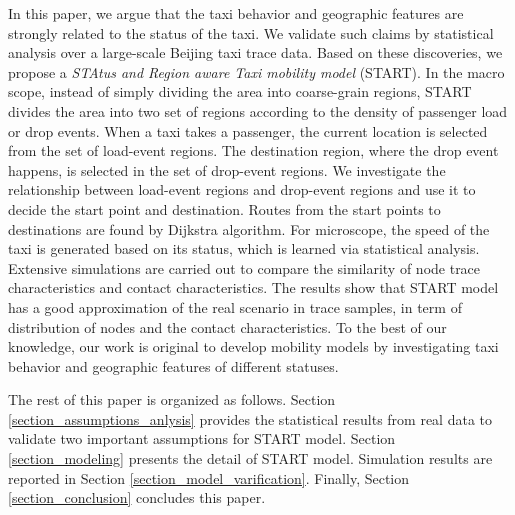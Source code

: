 In this paper, we argue that the taxi behavior and geographic features are strongly related to the status of the taxi. We validate such claims by statistical analysis over a large-scale Beijing taxi trace data. Based on these discoveries, we propose a \emph{STAtus and Region aware Taxi mobility model} (START). In the macro scope, instead of simply dividing the area into coarse-grain regions, START divides the area into two set of regions according to the density of passenger load or drop events. 
When a taxi takes a passenger, the current location is selected from the set of load-event regions. The destination region, where the drop event happens, is selected in the set of drop-event regions.
We investigate the relationship between load-event regions and drop-event regions and use it to decide the start point and destination. Routes from the start points to destinations are found by Dijkstra algorithm. For microscope, the speed of the taxi is generated based on its status, which is learned via statistical analysis. Extensive simulations are carried out to compare the similarity of node trace characteristics and contact characteristics. The results show that START model has a good approximation of the real scenario in trace samples, in term of distribution of nodes and the contact characteristics. To the best of our knowledge, our work is original to develop mobility models by investigating taxi behavior and geographic features of different statuses.

The rest of this paper is organized as follows. Section \ref{section_assumptions_anlysis} provides the statistical results from real data to validate two important assumptions for START model. Section \ref{section_modeling} presents the detail of START model. Simulation results are reported in Section \ref{section_model_varification}. Finally, Section \ref{section_conclusion} concludes this paper.




